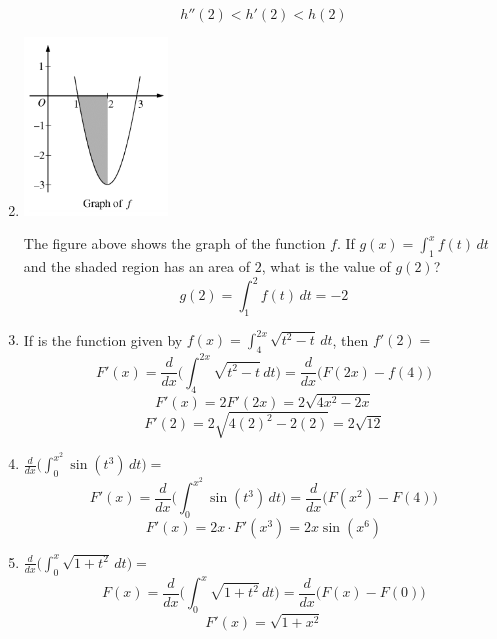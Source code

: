 \documentclass[12pt]{article}
\begin{document}
\begin{enumerate}
\begin{enumerate}
    \end{enumerate}
  $$  \boxed{h''(2)<h'(2)<h(2)}$$
    \item 
    \begin{center}
        \includegraphics[width=1.5in]{original-16.png}
    \end{center}
    The figure above shows the graph of the function $f$. If $g(x)=\int_{1}^{x}f(t)\,dt$ and the shaded region has an area of $2$, what is the value of $g(2)$?
    $$\boxed{g(2)=\int_{1}^{2}f(t)\,dt=-2}$$
    \newpage
    \item If is the function given by $f(x)=\int_{4}^{2x} \sqrt{t^2-t} \, dt$, then $f'(2)=$
$$F'(x)=\frac{d}{dx}\biggr( \int_{4}^{2x} \sqrt{t^2-t} \, dt \biggr)= \frac{d}{dx}\biggr( F(2x)-f(4) \biggr)$$
    $$F'(x)=2F'(2x)= 2\sqrt{4x^2-2x}$$
$$F'(2)= 2\sqrt{4(2)^2-2(2)}=\boxed{2\sqrt{12}}$$
    
    \item $\frac{d}{dx}\biggr( \int_{0}^{x^2} \sin(t^3) \, dt \biggr)=$
$$F'(x)=\frac{d}{dx}\biggr( \int_{0}^{x^2} \sin(t^3) \, dt \biggr) = \frac{d}{dx}\biggr( F(x^2)-F(4) \biggr)$$
 $$F'(x)=2x \cdot F'(x^3)= \boxed{2x\sin(x^6)}$$

    \item $\frac{d}{dx}\biggr( \int_{0}^{x} \sqrt{1+t^2} \, dt \biggr)=$
$$F(x)=\frac{d}{dx}\biggr( \int_{0}^{x} \sqrt{1+t^2} \, dt \biggr) = \frac{d}{dx}\biggr( F(x)-F(0) \biggr)$$
$$F'(x)=\boxed{\sqrt{1+x^2}}$$


\end{enumerate}
\end{document}
